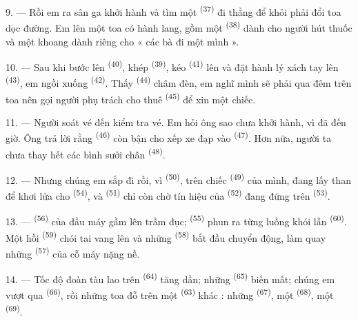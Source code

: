 9. --- Rồi em ra sân ga khởi hành và tìm một  \textsuperscript{(37)} đi
thẳng để khỏi phải đổi toa dọc đường. Em lên một toa có hành lang, gồm một
 \textsuperscript{(38)} dành cho người hút thuốc và một khoang dành riêng
cho « các bà đi một mình ».

\VUsaut{3.0mm}

10. --- Sau khi bước lên  \textsuperscript{(40)}, khép
 \textsuperscript{(39)}, kéo  \textsuperscript{(41)} lên và
đặt hành lý xách tay lên  \textsuperscript{(43)}, em ngồi xuống
 \textsuperscript{(42)}. Thấy 
\textsuperscript{(44)} châm đèn, em nghĩ mình sẽ phải qua đêm trên toa nên gọi người phụ
trách cho thuê  \textsuperscript{(45)} để xin một chiếc.

11. --- Người soát vé đến kiểm tra vé. Em hỏi ông sao chưa khởi hành, vì đã đến giờ. Ông
trả lời rằng  \textsuperscript{(46)} còn bận cho xếp xe đạp vào
 \textsuperscript{(47)}. Hơn nữa, người ta chưa thay hết các bình
sưởi chân \textsuperscript{(48)}.

12. --- Nhưng chúng em sắp đi rồi, vì 
\textsuperscript{(50)}, trên chiếc  \textsuperscript{(49)} của mình, đang
lấy than để khơi lửa cho  \textsuperscript{(54)}, và  \textsuperscript{(51)} chỉ còn chờ tín hiệu của 
\textsuperscript{(52)} đang đứng trên  \textsuperscript{(53)}.

13. ---  \textsuperscript{(56)} của đầu máy gầm lên trầm đục;
 \textsuperscript{(55)} phun ra từng luồng khói lẫn 
\textsuperscript{(60)}. Một hồi  \textsuperscript{(59)} chói tai vang lên và
những  \textsuperscript{(58)} bắt đầu chuyển động, làm quay những
 \textsuperscript{(57)} của cỗ máy nặng nề.

\VUsaut{3.0mm}
\VUsaut{3.0mm}

14. --- Tốc độ đoàn tàu lao trên  \textsuperscript{(64)} tăng dần;
những  \textsuperscript{(65)} biến mất; chúng em vượt qua  \textsuperscript{(66)}, rồi những toa đỗ trên một 
\textsuperscript{(63)} khác : những  \textsuperscript{(67)}, một
 \textsuperscript{(68)}, một 
\textsuperscript{(69)}.

